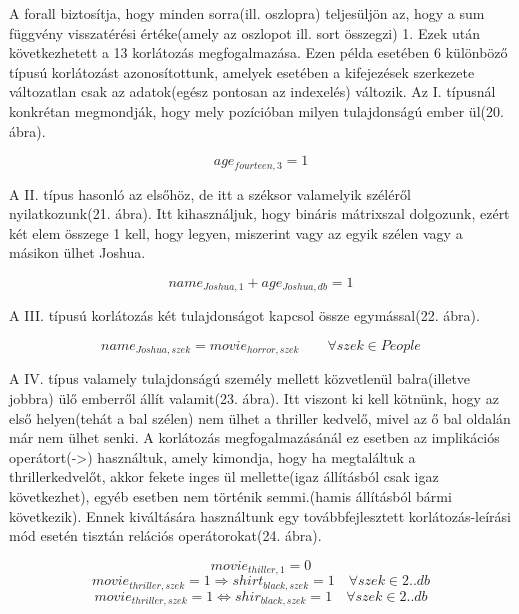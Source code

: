 \documentclass[12pt,a4paper,twoside, openright]{report}
\begin{document}
    A forall biztosítja, hogy minden sorra(ill. oszlopra) teljesüljön az, hogy a sum függvény visszatérési értéke(amely az oszlopot ill. sort összegzi) 1.
    Ezek után következhetett a 13 korlátozás megfogalmazása.
    Ezen példa esetében 6 különböző típusú korlátozást azonosítottunk, amelyek esetében a kifejezések szerkezete változatlan csak az adatok(egész pontosan az indexelés) változik.
    Az I. típusnál konkrétan megmondják, hogy mely pozícióban milyen tulajdonságú ember ül(20. ábra).

    \begin{equation}
     age_ {fourteen,3}=1 
     \end{equation}

    A II. típus hasonló az elsőhöz, de itt a széksor valamelyik széléről nyilatkozunk(21. ábra).
    Itt kihasználjuk, hogy bináris mátrixszal dolgozunk, ezért két elem összege 1 kell, hogy legyen, miszerint vagy az egyik szélen vagy a másikon ülhet Joshua.

    \begin{equation}
    name_{Joshua,1} + age_{Joshua,db} =1
    \end{equation}

    A III. típusú korlátozás két tulajdonságot kapcsol össze egymással(22. ábra).

    \begin{equation}
    name_{Joshua,szek} = movie_{horror,szek} \qquad \forall szek \in People
    \end{equation}

    A IV. típus valamely tulajdonságú személy mellett közvetlenül balra(illetve jobbra) ülő emberről állít valamit(23. ábra).
    Itt viszont ki kell kötnünk, hogy az első helyen(tehát a bal szélen) nem ülhet a thriller kedvelő, mivel az ő bal oldalán már nem ülhet senki.
    A korlátozás megfogalmazásánál ez esetben az implikációs operátort(->) használtuk, amely kimondja, hogy ha megtaláltuk a thrillerkedvelőt, akkor fekete inges ül mellette(igaz állításból csak igaz következhet), egyéb esetben nem történik semmi.(hamis állításból bármi következik).
    Ennek kiváltására használtunk egy továbbfejlesztett korlátozás-leírási mód esetén tisztán relációs operátorokat(24. ábra).

    \begin{equation}
     movie_{thiller,1}=0 
     \end{equation}
    \begin{equation}
    movie_{thriller,szek}=1 \Rightarrow shirt_{black,szek}=1 \quad \forall szek \in 2..db
    \end{equation}
    \begin{equation}
    movie_{thriller,szek}=1 \Leftrightarrow shir_{black,szek}=1 \quad \forall szek\in 2..db
    \end{equation}
\end{document}
